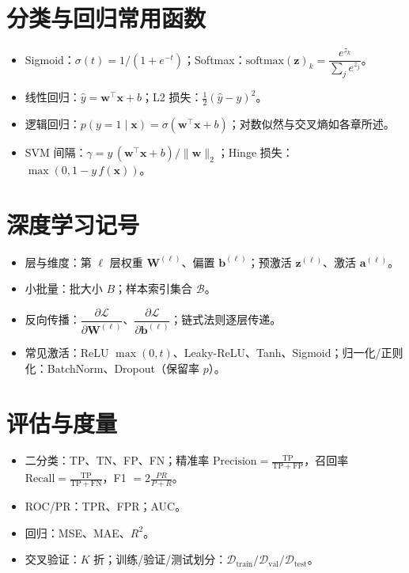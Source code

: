 \documentclass[UTF8,zihao=-4]{ctexart}
\newcommand{\softmax}{\mathrm{softmax}}
\newcommand{\1}{\mathbf{1}}
\newcommand{\0}{\mathbf{0}}
\begin{document}
\section{分类与回归常用函数}
\begin{itemize}
  \item Sigmoid：$\sigma(t)=1/(1+e^{-t})$；Softmax：$\softmax(\bm{z})_k=\dfrac{e^{z_k}}{\sum_j e^{z_j}}$。
  \item 线性回归：$\hat{y}=\bm{w}^\top\bm{x}+b$；L2 损失：$\tfrac{1}{2}(\hat{y}-y)^2$。
  \item 逻辑回归：$p(y=1\mid\bm{x})=\sigma(\bm{w}^\top\bm{x}+b)$；对数似然与交叉熵如各章所述。
  \item SVM 间隔：$\gamma = y\,(\bm{w}^\top\bm{x}+b)/\lVert\bm{w}\rVert_2$；Hinge 损失：$\max(0,1-y\,f(\bm{x}))$。
\end{itemize}

\section{深度学习记号}
\begin{itemize}
  \item 层与维度：第 $\ell$ 层权重 $\bm{W}^{(\ell)}$、偏置 $\bm{b}^{(\ell)}$；预激活 $\bm{z}^{(\ell)}$、激活 $\bm{a}^{(\ell)}$。
  \item 小批量：批大小 $B$；样本索引集合 $\mathcal{B}$。
  \item 反向传播：$\dfrac{\partial\mathcal{L}}{\partial \bm{W}^{(\ell)}}$、$\dfrac{\partial\mathcal{L}}{\partial \bm{b}^{(\ell)}}$；链式法则逐层传递。
  \item 常见激活：ReLU $\max(0,t)$、Leaky-ReLU、Tanh、Sigmoid；归一化/正则化：BatchNorm、Dropout（保留率 $p$）。
\end{itemize}

\section{评估与度量}
\begin{itemize}
  \item 二分类：TP、TN、FP、FN；精准率 $\mathrm{Precision}=\tfrac{\mathrm{TP}}{\mathrm{TP}+\mathrm{FP}}$，召回率 $\mathrm{Recall}=\tfrac{\mathrm{TP}}{\mathrm{TP}+\mathrm{FN}}$，F1 $=2\tfrac{PR}{P+R}$。
  \item ROC/PR：TPR、FPR；AUC。
  \item 回归：MSE、MAE、$R^2$。
  \item 交叉验证：$K$ 折；训练/验证/测试划分：$\mathcal{D}_{\text{train}}/\mathcal{D}_{\text{val}}/\mathcal{D}_{\text{test}}$。
\end{itemize}
\end{document}
